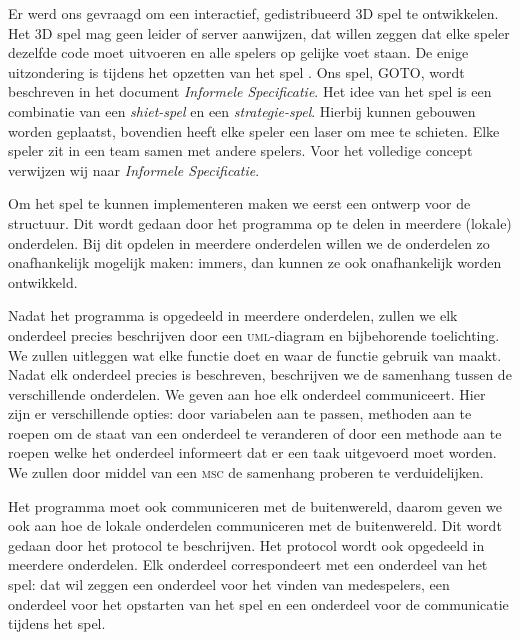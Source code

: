 Er werd ons gevraagd om een interactief, gedistribueerd 3D spel te ontwikkelen. Het 3D spel mag geen leider of server aanwijzen, dat willen zeggen dat elke speler dezelfde code moet uitvoeren en alle spelers op gelijke voet staan. De enige uitzondering is tijdens het opzetten van het spel . Ons spel, \textsc{GOTO}, wordt beschreven in het document \emph{Informele Specificatie}. Het idee van het spel is een combinatie van een \emph{shiet-spel} en een \emph{strategie-spel}. Hierbij kunnen gebouwen worden geplaatst, bovendien heeft elke speler een laser om mee te schieten. Elke speler zit in een team samen met andere spelers. Voor het volledige concept verwijzen wij naar \emph{Informele Specificatie}.

Om het spel te kunnen implementeren maken we eerst een ontwerp voor de structuur. Dit wordt gedaan door het programma op te delen in meerdere (lokale) onderdelen. Bij dit opdelen in meerdere onderdelen willen we de onderdelen zo onafhankelijk mogelijk maken: immers, dan kunnen ze ook onafhankelijk worden ontwikkeld.

Nadat het programma is opgedeeld in meerdere onderdelen, zullen we elk onderdeel precies beschrijven door een \textsc{uml}-diagram en bijbehorende toelichting. We zullen uitleggen wat elke functie doet en waar de functie gebruik van maakt. Nadat elk onderdeel precies is beschreven, beschrijven we de samenhang tussen de verschillende onderdelen. We geven aan hoe elk onderdeel communiceert. Hier zijn er verschillende opties: door variabelen aan te passen, methoden aan te roepen om de staat van een onderdeel te veranderen of door een methode aan te roepen welke het onderdeel informeert dat er een taak uitgevoerd moet worden. We zullen door middel van een \textsc{msc} de samenhang proberen te verduidelijken.

Het programma moet ook communiceren met de buitenwereld, daarom geven we ook aan hoe de lokale onderdelen communiceren met de buitenwereld. Dit wordt gedaan door het protocol te beschrijven. Het protocol wordt ook opgedeeld in meerdere onderdelen. Elk onderdeel correspondeert met een onderdeel van het spel: dat wil zeggen een onderdeel voor het vinden van medespelers, een onderdeel voor het opstarten van het spel en een onderdeel voor de communicatie tijdens het spel.

